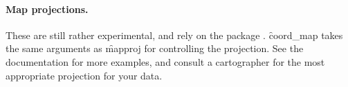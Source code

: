 \paragraph{Map projections.}  These are still rather experimental, and rely on the  package \citep{mapproj}.  \f{coord_map} takes the same arguments as \f{mapproj} for controlling the projection.  See the documentation for more examples, and consult a cartographer for the most appropriate projection for your data.


